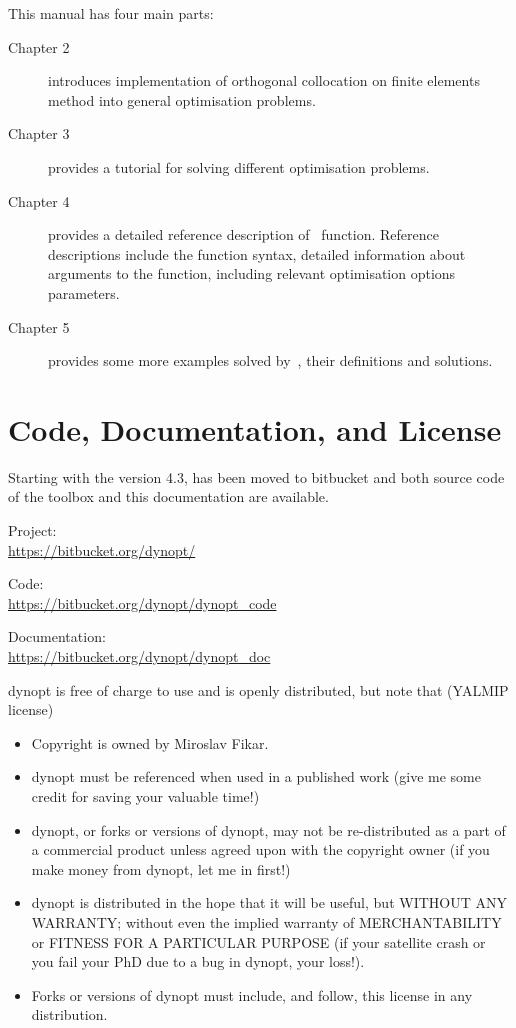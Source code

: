 This manual has four main parts:
\begin{description}
\item[Chapter 2] introduces implementation of orthogonal collocation
  on finite elements method into general optimisation problems.
\item[Chapter 3] provides a tutorial for solving different
  optimisation problems.
\item[Chapter 4] provides a detailed reference description
  of~ function. Reference descriptions include the
  function syntax, detailed information about arguments to the
  function, including relevant optimisation options parameters.
\item[Chapter 5] provides some more examples solved by~,
  their definitions and solutions.
\end{description}

\section{Code, Documentation, and License}
Starting with the version 4.3,  has been moved to
bitbucket and both source code of the toolbox and this documentation
are available. 

Project: \\
\url{https://bitbucket.org/dynopt/}

Code:\\
\url{https://bitbucket.org/dynopt/dynopt_code}

Documentation:\\
\url{https://bitbucket.org/dynopt/dynopt_doc}

\medskip
\noindent
dynopt is free of charge to use and is openly distributed, but note
that (YALMIP license)
\begin{itemize}
\item Copyright is owned by Miroslav Fikar.
\item dynopt must be referenced when used in a published work (give me
  some credit for saving your valuable time!)
\item dynopt, or forks or versions of dynopt, may not be
  re-distributed as a part of a commercial product unless agreed upon
  with the copyright owner (if you make money from dynopt, let me in
  first!)
\item dynopt is distributed in the hope that it will be useful, but
  WITHOUT ANY WARRANTY; without even the implied warranty of
  MERCHANTABILITY or FITNESS FOR A PARTICULAR PURPOSE (if your
  satellite crash or you fail your PhD due to a bug in dynopt, your
  loss!).
\item Forks or versions of dynopt must include, and follow, this
  license in any distribution.
\end{itemize}
 
